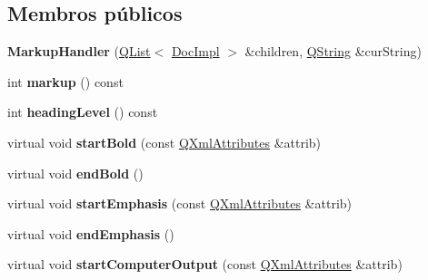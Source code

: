 \subsection*{Membros públicos}
\begin{DoxyCompactItemize}
\item 
\hypertarget{class_markup_handler_a02ec44ff00721bc085214b349a3b1ca3}{{\bfseries Markup\-Handler} (\hyperlink{class_q_list}{Q\-List}$<$ \hyperlink{class_doc_impl}{Doc\-Impl} $>$ \&children, \hyperlink{class_q_string}{Q\-String} \&cur\-String)}\label{class_markup_handler_a02ec44ff00721bc085214b349a3b1ca3}

\item 
\hypertarget{class_markup_handler_a11bc90614b58fbc8eb3b568e54ee0ed1}{int {\bfseries markup} () const }\label{class_markup_handler_a11bc90614b58fbc8eb3b568e54ee0ed1}

\item 
\hypertarget{class_markup_handler_ae3609471d366b419b41b3de2fd61506a}{int {\bfseries heading\-Level} () const }\label{class_markup_handler_ae3609471d366b419b41b3de2fd61506a}

\item 
\hypertarget{class_markup_handler_a391f7c0034cfbe4c473cd746fceb3ae7}{virtual void {\bfseries start\-Bold} (const \hyperlink{class_q_xml_attributes}{Q\-Xml\-Attributes} \&attrib)}\label{class_markup_handler_a391f7c0034cfbe4c473cd746fceb3ae7}

\item 
\hypertarget{class_markup_handler_a1e1a209879148bfcb4b57ab294b37b90}{virtual void {\bfseries end\-Bold} ()}\label{class_markup_handler_a1e1a209879148bfcb4b57ab294b37b90}

\item 
\hypertarget{class_markup_handler_a86448e626681e679fd2386bd668440ab}{virtual void {\bfseries start\-Emphasis} (const \hyperlink{class_q_xml_attributes}{Q\-Xml\-Attributes} \&attrib)}\label{class_markup_handler_a86448e626681e679fd2386bd668440ab}

\item 
\hypertarget{class_markup_handler_a5c4adfb425dee0e192e5b606eab0114a}{virtual void {\bfseries end\-Emphasis} ()}\label{class_markup_handler_a5c4adfb425dee0e192e5b606eab0114a}

\item 
\hypertarget{class_markup_handler_a33d2e58a7857922b74266a02c26a5ddb}{virtual void {\bfseries start\-Computer\-Output} (const \hyperlink{class_q_xml_attributes}{Q\-Xml\-Attributes} \&attrib)}\label{class_markup_handler_a33d2e58a7857922b74266a02c26a5ddb}


\end{DoxyCompactItemize}
